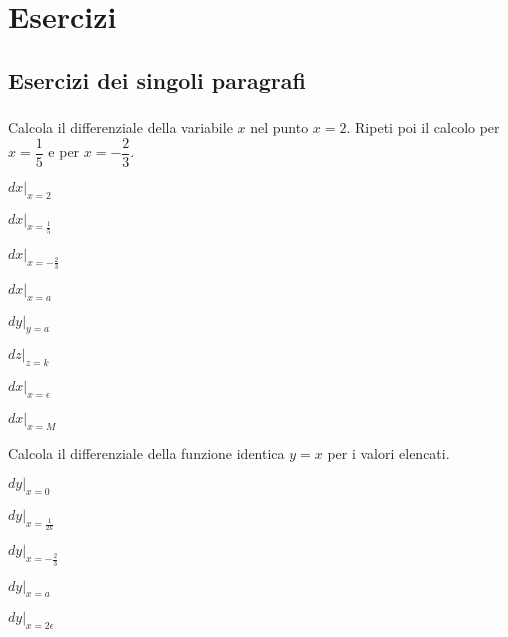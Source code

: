 
\section{Esercizi}

\subsection{Esercizi dei singoli paragrafi}

\subsubsection*{}
\begin{esercizio}
\label{ese:dif01}
 Calcola il differenziale della variabile $x$ nel punto $x=2$. Ripeti poi il 
 calcolo per $x=\dfrac{1}{5}$ e per $x=-\dfrac{2}{3}$.\\
\begin{inaccessibleblock}
 \begin{minipage}[]{.45 \textwidth}
\begin{enumeratea}
  \item $dx|_{x=2}$
 \item $dx|_{x=\frac{1}{5}}$
 \item $dx|_{x=-\frac{2}{3}}$
 \item $dx|_{x=a}$ 
\end{enumeratea}
 \end{minipage} 
 \hfill
 \begin{minipage}[]{.45 \textwidth}
\begin{enumeratea}\setcounter{enumi}{4}
\item $dy|_{y=a}$
 \item $dz|_{z=k}$
 \item $dx|_{x=\epsilon}$
 \item $dx|_{x=M}$
\end{enumeratea}
 \end{minipage}
\end{inaccessibleblock}  
\end{esercizio}

\begin{esercizio}
\label{ese:dif02}
 Calcola il differenziale della funzione identica $y=x$ per i valori elencati.
\begin{enumeratea}
 \item $dy|_{x=0}$
 \item $dy|_{x=\frac{1}{2k}}$
 \item $dy|_{x=-\frac{2}{3}}$
 \item $dy|_{x=a} $
 \item $dy|_{x=2\epsilon} $
 \end{enumeratea}
\end{esercizio}
 
